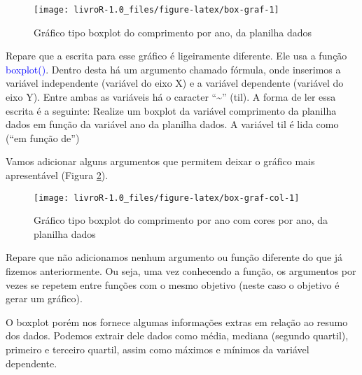 \documentclass[14pt,titlepage, oneside, openany, a4paper]{book}
\newenvironment{Shaded}{\begin{snugshade}}{\end{snugshade}}
\newcommand{\DataTypeTok}[1]{\textcolor[rgb]{0.13,0.29,0.53}{#1}}
\newcommand{\KeywordTok}[1]{\textcolor[rgb]{0.13,0.29,0.53}{\textbf{#1}}}
\newcommand{\NormalTok}[1]{#1}
\newcommand{\OperatorTok}[1]{\textcolor[rgb]{0.81,0.36,0.00}{\textbf{#1}}}
\newcommand{\StringTok}[1]{\textcolor[rgb]{0.31,0.60,0.02}{#1}}
\begin{document}
\begin{figure}[H]
\texttt{[image: livroR-1.0\_files/figure-latex/box-graf-1]} \caption{Gráfico tipo boxplot do comprimento por ano, da planilha dados}\label{fig:box-graf}
\end{figure}

Repare que a escrita para esse gráfico é ligeiramente diferente. Ele usa a função \textcolor{blue}{boxplot()}. Dentro desta há um argumento chamado fórmula, onde inserimos a variável independente (variável do eixo X) e a variável dependente (variável do eixo Y). Entre ambas as variáveis há o caracter ``\textasciitilde{}'' (til). A forma de ler essa escrita é a seguinte: Realize um boxplot da variável comprimento da planilha dados em função da variável ano da planilha dados. A variável til é lida como (``em função de'')

Vamos adicionar alguns argumentos que permitem deixar o gráfico mais apresentável (Figura \ref{fig:box-graf-col}).

\begin{Shaded}
\end{Shaded}

\begin{figure}[H]
\texttt{[image: livroR-1.0\_files/figure-latex/box-graf-col-1]} \caption{Gráfico tipo boxplot do comprimento por ano com cores por ano, da planilha dados}\label{fig:box-graf-col}
\end{figure}

Repare que não adicionamos nenhum argumento ou função diferente do que já fizemos anteriormente. Ou seja, uma vez conhecendo a função, os argumentos por vezes se repetem entre funções com o mesmo objetivo (neste caso o objetivo é gerar um gráfico).

O boxplot porém nos fornece algumas informações extras em relação ao resumo dos dados. Podemos extrair dele dados como média, mediana (segundo quartil), primeiro e terceiro quartil, assim como máximos e mínimos da variável dependente.
\end{document}

